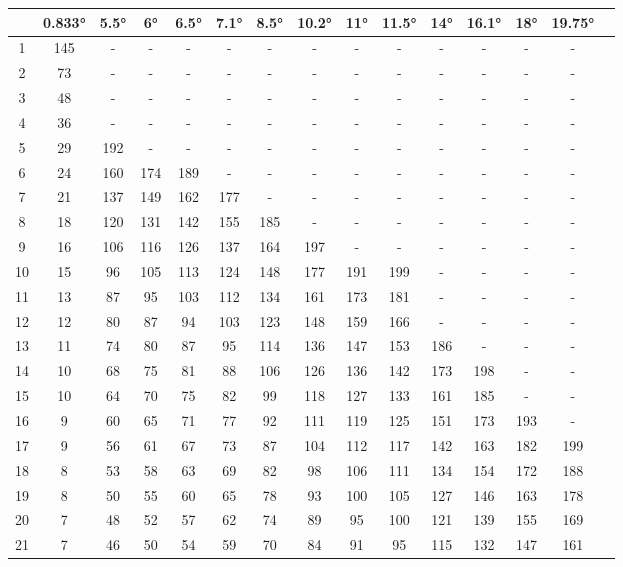 \begin{scriptsize}\begin{longtable}{c |c |c |c |c |c |c |c |c |c |c |c |c |c |c}
		\space &0.833°&5.5°&6°&6.5°&7.1°&8.5°&10.2°&11°&11.5°&14°&16.1°&18°&19.75°\\\hline
		1 & 145 & - & - & - & - & - & - & - & - & - & - & - & -\\
		2 & 73 & - & - & - & - & - & - & - & - & - & - & - & -\\
		3 & 48 & - & - & - & - & - & - & - & - & - & - & - & -\\
		4 & 36 & - & - & - & - & - & - & - & - & - & - & - & -\\
		5 & 29 & 192 & - & - & - & - & - & - & - & - & - & - & -\\
		6 & 24 & 160 & 174 & 189 & - & - & - & - & - & - & - & - & -\\
		7 & 21 & 137 & 149 & 162 & 177 & - & - & - & - & - & - & - & -\\
		8 & 18 & 120 & 131 & 142 & 155 & 185 & - & - & - & - & - & - & -\\
		9 & 16 & 106 & 116 & 126 & 137 & 164 & 197 & - & - & - & - & - & -\\
		10 & 15 & 96 & 105 & 113 & 124 & 148 & 177 & 191 & 199 & - & - & - & -\\
		11 & 13 & 87 & 95 & 103 & 112 & 134 & 161 & 173 & 181 & - & - & - & -\\
		12 & 12 & 80 & 87 & 94 & 103 & 123 & 148 & 159 & 166 & - & - & - & -\\
		13 & 11 & 74 & 80 & 87 & 95 & 114 & 136 & 147 & 153 & 186 & - & - & -\\
		14 & 10 & 68 & 75 & 81 & 88 & 106 & 126 & 136 & 142 & 173 & 198 & - & -\\
		15 & 10 & 64 & 70 & 75 & 82 & 99 & 118 & 127 & 133 & 161 & 185 & - & -\\
		16 & 9 & 60 & 65 & 71 & 77 & 92 & 111 & 119 & 125 & 151 & 173 & 193 & -\\
		17 & 9 & 56 & 61 & 67 & 73 & 87 & 104 & 112 & 117 & 142 & 163 & 182 & 199\\
		18 & 8 & 53 & 58 & 63 & 69 & 82 & 98 & 106 & 111 & 134 & 154 & 172 & 188\\
		19 & 8 & 50 & 55 & 60 & 65 & 78 & 93 & 100 & 105 & 127 & 146 & 163 & 178\\
		20 & 7 & 48 & 52 & 57 & 62 & 74 & 89 & 95 & 100 & 121 & 139 & 155 & 169\\
		21 & 7 & 46 & 50 & 54 & 59 & 70 & 84 & 91 & 95 & 115 & 132 & 147 & 161\\

\end{longtable}
\end{scriptsize}
